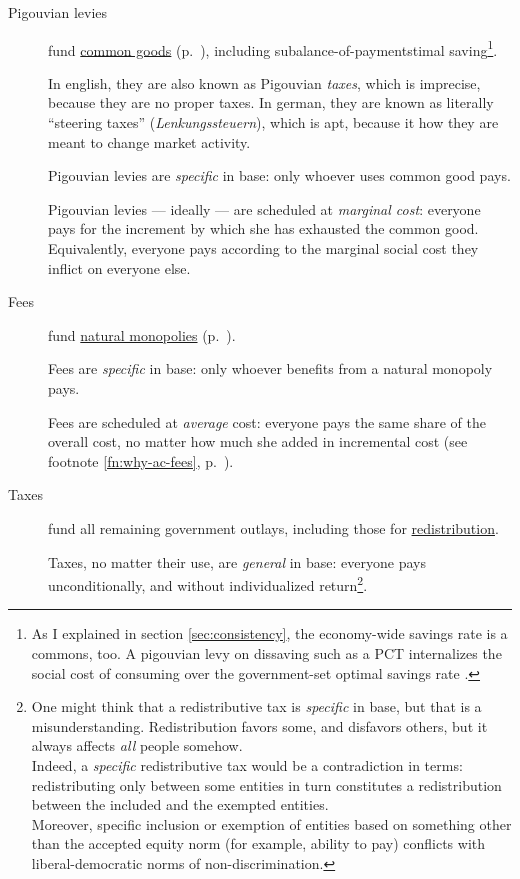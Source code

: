 \begin{description}
	\item[Pigouvian levies]  \label{sec:levies} fund \hyperref[sec:common-good]{common goods} (p.~\pageref{sec:common-good}), including subalance-of-paymentstimal saving\footnote{
		As I explained in section \ref{sec:consistency}, the economy-wide savings rate is a commons, too. A pigouvian levy on dissaving such as a \gls{PCT} internalizes the social cost of consuming over the government-set optimal savings rate \citep{Held2010a}.}. %

	In english, they are also known as Pigouvian \emph{taxes}, which is imprecise, because they are no proper taxes. In german, they are known as literally ``steering taxes'' (\emph{Lenkungssteuern}), which is apt, because it how they are meant to change market activity.

	Pigouvian levies are \emph{specific} in base: only whoever uses common good pays.

	Pigouvian levies --- ideally --- are scheduled at \emph{marginal cost}: everyone pays for the increment by which she has exhausted the common good. Equivalently, everyone pays according to the marginal social cost they inflict on everyone else.

	\item[Fees]  \label{sec:fees}
	fund \hyperref[sec:natural-monopoly]{natural monopolies} (p.~\pageref{sec:natural-monopoly}).

	Fees are \emph{specific} in base: only whoever benefits from a natural monopoly pays.

	Fees are scheduled at \emph{average} cost: everyone pays the same share of the overall cost, no matter how much she added in incremental cost (see footnote \ref{fn:why-ac-fees}, p.~\pageref{fn:why-ac-fees}).

	\item[Taxes]  \label{sec:taxes} fund all remaining government outlays, including those for \hyperref[sec:redistributivepolicy]{redistribution}.

	Taxes, no matter their use, are \emph{general} in base: everyone pays unconditionally, and without individualized return\footnote{
		One might think that a redistributive tax is \emph{specific} in base, but that is a misunderstanding. Redistribution favors some, and disfavors others, but it always affects \emph{all} people somehow.\\
		Indeed, a \emph{specific} redistributive tax would be a contradiction in terms: redistributing only between some entities in turn constitutes a redistribution between the included and the exempted entities.\\ Moreover, specific inclusion or exemption of entities based on something other than the accepted equity norm (for example, ability to pay) conflicts with liberal-democratic norms of non-discrimination.}.


\end{description}
